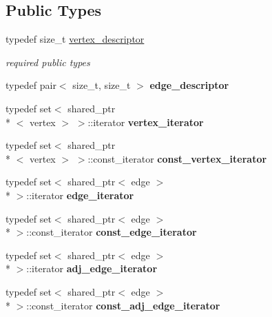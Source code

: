 \subsection*{Public Types}
\begin{DoxyCompactItemize}
\item 
\hypertarget{classmystl_1_1graph_ad2732d0343911bde1277a7b8b293c256}{typedef size\+\_\+t \hyperlink{classmystl_1_1graph_ad2732d0343911bde1277a7b8b293c256}{vertex\+\_\+descriptor}}\label{classmystl_1_1graph_ad2732d0343911bde1277a7b8b293c256}

\begin{DoxyCompactList}\small\item\em required public types \end{DoxyCompactList}\item 
\hypertarget{classmystl_1_1graph_a36553c01984bf2cbdce92f6da743ca51}{typedef pair$<$ size\+\_\+t, size\+\_\+t $>$ {\bfseries edge\+\_\+descriptor}}\label{classmystl_1_1graph_a36553c01984bf2cbdce92f6da743ca51}

\item 
\hypertarget{classmystl_1_1graph_a2b72433f37e8f49ea4eb33237aaf7840}{typedef set$<$ shared\+\_\+ptr\\*
$<$ vertex $>$ $>$\+::iterator {\bfseries vertex\+\_\+iterator}}\label{classmystl_1_1graph_a2b72433f37e8f49ea4eb33237aaf7840}

\item 
\hypertarget{classmystl_1_1graph_a62aba2cfdc9b8487be4016c71088c11e}{typedef set$<$ shared\+\_\+ptr\\*
$<$ vertex $>$ $>$\+::const\+\_\+iterator {\bfseries const\+\_\+vertex\+\_\+iterator}}\label{classmystl_1_1graph_a62aba2cfdc9b8487be4016c71088c11e}

\item 
\hypertarget{classmystl_1_1graph_ae516cab08fa293faf4c126487932759a}{typedef set$<$ shared\+\_\+ptr$<$ edge $>$\\*
 $>$\+::iterator {\bfseries edge\+\_\+iterator}}\label{classmystl_1_1graph_ae516cab08fa293faf4c126487932759a}

\item 
\hypertarget{classmystl_1_1graph_a1479778e9a47b879c7c77c4e6ab63cd6}{typedef set$<$ shared\+\_\+ptr$<$ edge $>$\\*
 $>$\+::const\+\_\+iterator {\bfseries const\+\_\+edge\+\_\+iterator}}\label{classmystl_1_1graph_a1479778e9a47b879c7c77c4e6ab63cd6}

\item 
\hypertarget{classmystl_1_1graph_ac74fa1c083b1041103a20544fcbf7c17}{typedef set$<$ shared\+\_\+ptr$<$ edge $>$\\*
 $>$\+::iterator {\bfseries adj\+\_\+edge\+\_\+iterator}}\label{classmystl_1_1graph_ac74fa1c083b1041103a20544fcbf7c17}

\item 
\hypertarget{classmystl_1_1graph_a01df49c28ef2f886d600175055cd2915}{typedef set$<$ shared\+\_\+ptr$<$ edge $>$\\*
 $>$\+::const\+\_\+iterator {\bfseries const\+\_\+adj\+\_\+edge\+\_\+iterator}}\label{classmystl_1_1graph_a01df49c28ef2f886d600175055cd2915}

\end{DoxyCompactItemize}

